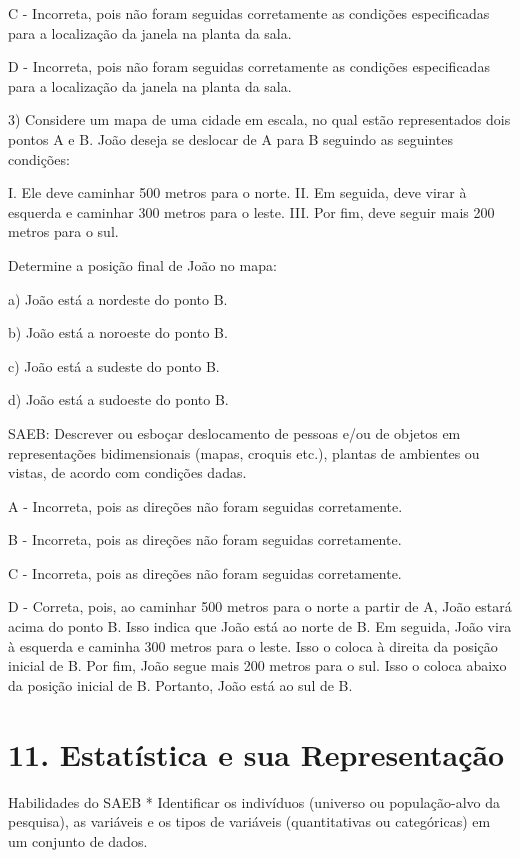 C - Incorreta, pois não foram seguidas corretamente as condições
especificadas para a localização da janela na planta da sala.

D - Incorreta, pois não foram seguidas corretamente as condições
especificadas para a localização da janela na planta da sala.

3) Considere um mapa de uma cidade em escala, no qual estão
representados dois pontos A e B. João deseja se deslocar de A para B
seguindo as seguintes condições:

I. Ele deve caminhar 500 metros para o norte. II. Em seguida, deve virar
à esquerda e caminhar 300 metros para o leste. III. Por fim, deve seguir
mais 200 metros para o sul.

Determine a posição final de João no mapa:

a) João está a nordeste do ponto B.

b) João está a noroeste do ponto B.

c) João está a sudeste do ponto B.

d) João está a sudoeste do ponto B.

SAEB: Descrever ou esboçar deslocamento de pessoas e/ou de objetos em
representações bidimensionais (mapas, croquis etc.), plantas de
ambientes ou vistas, de acordo com condições dadas.

A - Incorreta, pois as direções não foram seguidas corretamente.

B - Incorreta, pois as direções não foram seguidas corretamente.

C - Incorreta, pois as direções não foram seguidas corretamente.

D - Correta, pois, ao caminhar 500 metros para o norte a partir de A,
João estará acima do ponto B. Isso indica que João está ao norte de B.
Em seguida, João vira à esquerda e caminha 300 metros para o leste. Isso
o coloca à direita da posição inicial de B. Por fim, João segue mais 200
metros para o sul. Isso o coloca abaixo da posição inicial de B.
Portanto, João está ao sul de B.

\hypertarget{estatuxedstica-e-sua-representauxe7uxe3o}{%
\section{11. Estatística e sua
Representação}\label{estatuxedstica-e-sua-representauxe7uxe3o}}

Habilidades do SAEB * Identificar os indivíduos (universo ou
população-alvo da pesquisa), as variáveis e os tipos de variáveis
(quantitativas ou categóricas) em um conjunto de dados.

